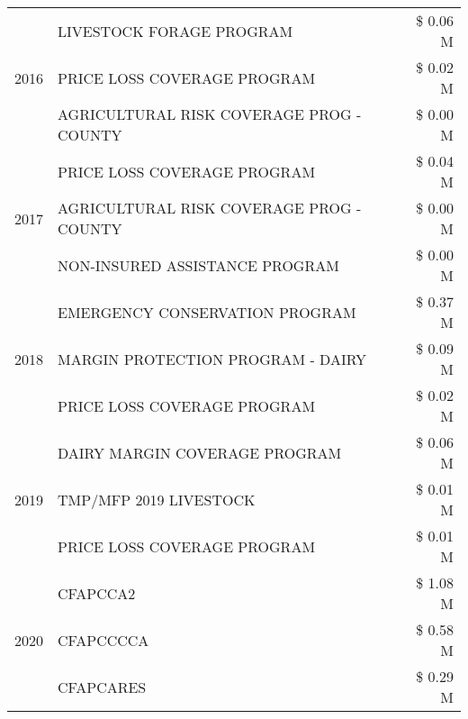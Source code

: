 \begin{tabular}{llr}
\cline{1-3}
\multirow[t]{3}{*}{2016} & LIVESTOCK FORAGE PROGRAM & \$ 0.06 M \\
 & PRICE LOSS COVERAGE PROGRAM & \$ 0.02 M \\
 & AGRICULTURAL RISK COVERAGE PROG - COUNTY & \$ 0.00 M \\
\cline{1-3}
\multirow[t]{3}{*}{2017} & PRICE LOSS COVERAGE PROGRAM & \$ 0.04 M \\
 & AGRICULTURAL RISK COVERAGE PROG - COUNTY & \$ 0.00 M \\
 & NON-INSURED ASSISTANCE PROGRAM & \$ 0.00 M \\
\cline{1-3}
\multirow[t]{3}{*}{2018} & EMERGENCY CONSERVATION PROGRAM & \$ 0.37 M \\
 & MARGIN PROTECTION PROGRAM - DAIRY & \$ 0.09 M \\
 & PRICE LOSS COVERAGE PROGRAM & \$ 0.02 M \\
\cline{1-3}
\multirow[t]{3}{*}{2019} & DAIRY MARGIN COVERAGE PROGRAM & \$ 0.06 M \\
 & TMP/MFP 2019 LIVESTOCK & \$ 0.01 M \\
 & PRICE LOSS COVERAGE PROGRAM & \$ 0.01 M \\
\cline{1-3}
\multirow[t]{3}{*}{2020} & CFAPCCA2 & \$ 1.08 M \\
 & CFAPCCCCA & \$ 0.58 M \\
 & CFAPCARES & \$ 0.29 M \\
\cline{1-3}
\bottomrule
\end{tabular}
